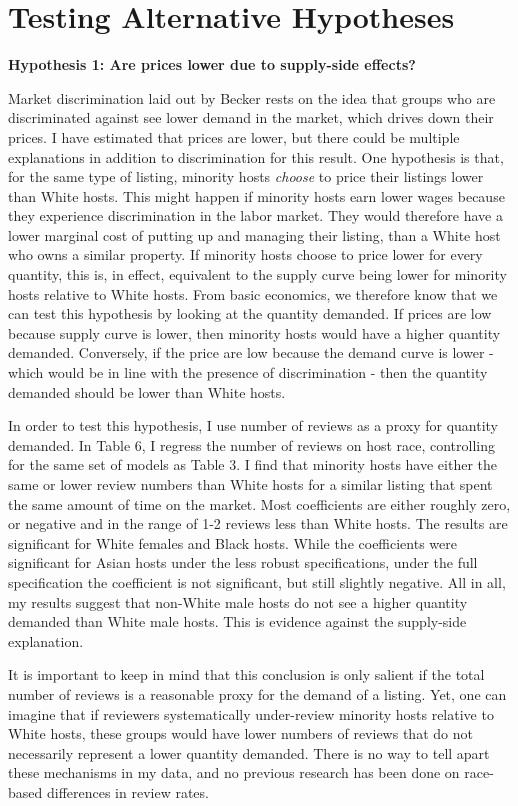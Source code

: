 \documentclass[11pt, oneside]{article}
\begin{document}
\section{Testing Alternative Hypotheses}
\textbf{Hypothesis 1: Are prices lower due to supply-side effects?}

Market discrimination laid out by Becker rests on the idea that groups who are discriminated against see lower demand in the market, which drives down their prices. I have estimated that prices are lower, but there could be multiple explanations in addition to discrimination for this result. One hypothesis is that, for the same type of listing, minority hosts \textit{choose} to price their listings lower than White hosts. This might happen if minority hosts earn lower wages because they experience discrimination in the labor market. They would therefore have a lower marginal cost of putting up and managing their listing, than a White host who owns a similar property. If minority hosts choose to price lower for every quantity, this is, in effect, equivalent to the supply curve being lower for minority hosts relative to White hosts. From basic economics, we therefore know that we can test this hypothesis by looking at the quantity demanded. If prices are low because supply curve is lower, then minority hosts would have a higher quantity demanded. Conversely, if the price are low because the demand curve is lower - which would be in line with the presence of discrimination - then the quantity demanded should be lower than White hosts. 

In order to test this hypothesis, I use number of reviews as a proxy for quantity demanded. In Table 6, I regress the number of reviews on host race, controlling for the same set of models as Table 3. I find that minority hosts have either the same or lower review numbers than White hosts for a similar listing that spent the same amount of time on the market. Most coefficients are either roughly zero, or negative and in the range of 1-2 reviews less than White hosts. The results are significant for White females and Black hosts. While the coefficients were significant for Asian hosts under the less robust specifications, under the full specification the coefficient is not significant, but still slightly negative. All in all, my results suggest that non-White male hosts do not see a higher quantity demanded than White male hosts. This is evidence against the supply-side explanation. 

It is important to keep in mind that this conclusion is only salient if the total number of reviews is a reasonable proxy for the demand of a listing. Yet, one can imagine that if reviewers systematically under-review minority hosts relative to White hosts, these groups would have lower numbers of reviews that do not necessarily represent a lower quantity demanded. There is no way to tell apart these mechanisms in my data, and no previous research has been done on race-based differences in review rates. 
\end{document}
